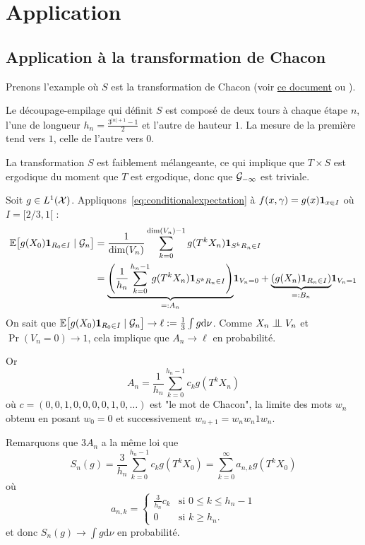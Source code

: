 \documentclass[12pt,a4paper]{article}
\begin{document}
\section{Application} 

\subsection{Application à la transformation de Chacon}

Prenons l'example où $S$ est la transformation de Chacon 
(voir \href{https://cdr.lib.unc.edu/indexablecontent/uuid:bfc41b0c-b048-440f-9a57-533e02ea4f76}{ce document} ou \cite{LauScale}). 

Le découpage-empilage qui définit $S$ est composé de deux tours à chaque étape $n$, 
l'une de longueur $h_n = \frac{3^{|n|+1}-1}{2}$ et l'autre de hauteur $1$.  
La mesure de la première tend vers $1$, celle de l'autre vers $0$. 

La transformation $S$ est faiblement mélangeante, ce qui implique que $T \times S$ 
est ergodique du moment que $T$ est ergodique, donc que $\mathcal{G}_{-\infty}$ est triviale. 


Soit $g \in L^1(\mathcal{X})$. 
Appliquons~\eqref{eq:conditionalexpectation} à 
$f(x,\gamma) = g(x)\boldsymbol 1_{x \in I}$ où $I=[2/3, 1[$ :
\begin{align*}
\mathbb{E}\bigl[g(X_0) \boldsymbol 1_{R_0 \in I} \mid \mathcal{G}_n\bigr]
&  = \frac{1}{\dim(V_n)}\sum_{k=0}^{\dim(V_n)-1} g(T^kX_n) \boldsymbol 1_{S^k R_n \in I} \\
& = \underset{=:A_n}{\underbrace{\left(\frac{1}{h_n}\sum_{k=0}^{h_n-1} g(T^kX_n) \boldsymbol 1_{S^k R_n \in I}\right)}}\boldsymbol 1_{V_n=0} 
+ \underset{=:B_n}{\underbrace{\left(g(X_n) \boldsymbol 1_{R_n \in I}\right)}}\boldsymbol 1_{V_n=1}
\end{align*}
On sait que 
$\mathbb{E}\bigl[g(X_0) \boldsymbol 1_{R_0 \in I} \mid \mathcal{G}_n\bigr] \to \ell:= \frac{1}{3}\int g \mathrm{d}\nu$. 
Comme $X_n \indep V_n$ et $\Pr(V_n=0) \to 1$, cela implique que $A_n \to \ell$ en probabilité. 

Or 
$$
A_n = \frac{1}{h_n}\sum_{k=0}^{h_n-1} c_k g(T^kX_n) 
$$
où $c = (0, 0, 1, 0, 0, 0, 0, 1, 0, \ldots)$ est "le mot de Chacon", 
la limite des mots $w_n$ obtenu en posant $w_0=0$ et successivement 
$w_{n+1} = w_nw_n1w_n$. 


Remarquons que $3A_n$ a la même loi que 
$$
S_n(g) = \frac{3}{h_n}\sum_{k=0}^{h_n-1} c_k g(T^kX_0) 
= \sum_{k=0}^\infty a_{n,k} g(T^kX_0) 
$$ 
où
$$
a_{n,k} = \begin{cases}
\frac{3}{h_n} c_k & \text{si $0 \leq k \leq h_n-1$} \\
0 & \text{si $k \geq h_n$}.
\end{cases}
$$
et donc $S_n(g) \to \int g \mathrm{d}\nu$ en probabilité. 
\end{document}
